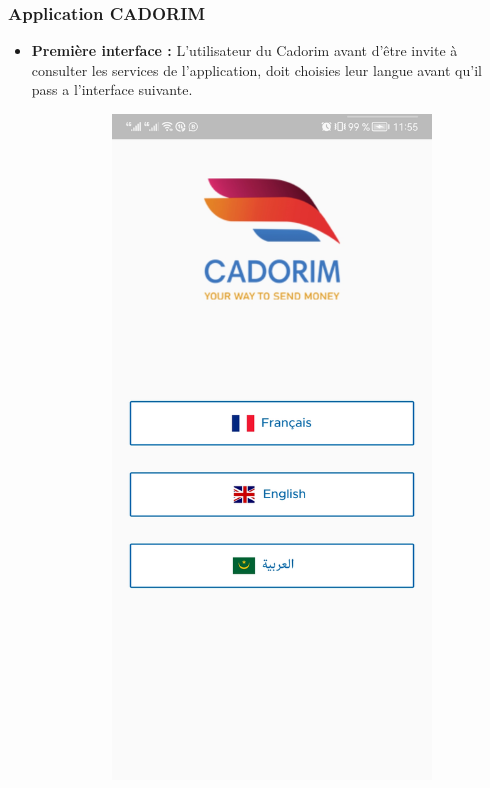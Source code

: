 \subsubsection{Application CADORIM}
\begin{itemize}[label=$\ast$]
		\item \textbf{Première interface :} L'utilisateur du Cadorim avant d'être invite à consulter les services de l'application, doit 
			choisies leur langue avant qu'il pass a l'interface suivante.
			
			\begin{figure}[!ht]
				\centering
				\begin{subfigure}{0.3\textwidth}
					\includegraphics[width=\hsize, valign=m ]{./Template LaTeX/Images/1.jpg}

\end{subfigure}
\end{figure}
\end{itemize}
